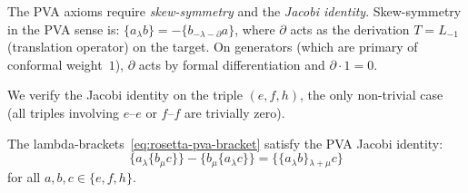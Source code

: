 The PVA axioms require \emph{skew-symmetry} and the \emph{Jacobi
identity}. Skew-symmetry in the PVA sense is:
$\{a {}_\lambda b\} = -\{b {}_{-\lambda - \partial} a\}$, where
$\partial$ acts as the derivation $T = L_{-1}$ (translation
operator) on the target. On generators (which are primary of
conformal weight~$1$), $\partial$ acts by formal differentiation
and $\partial \cdot 1 = 0$.

We verify the Jacobi identity on the triple $(e, f, h)$, the only
non-trivial case (all triples involving $e$--$e$ or $f$--$f$ are
trivially zero).

\begin{proposition}
\label{prop:rosetta-jacobi}
The lambda-brackets~\eqref{eq:rosetta-pva-bracket} satisfy the PVA
Jacobi identity\textup{:}
\begin{equation}\label{eq:rosetta-pva-jacobi}
\{a {}_\lambda \{b {}_\mu c\}\}
- \{b {}_\mu \{a {}_\lambda c\}\}
= \{\{a {}_\lambda b\} {}_{\lambda+\mu} c\}
\end{equation}
for all $a, b, c \in \{e, f, h\}$.
\end{proposition}

